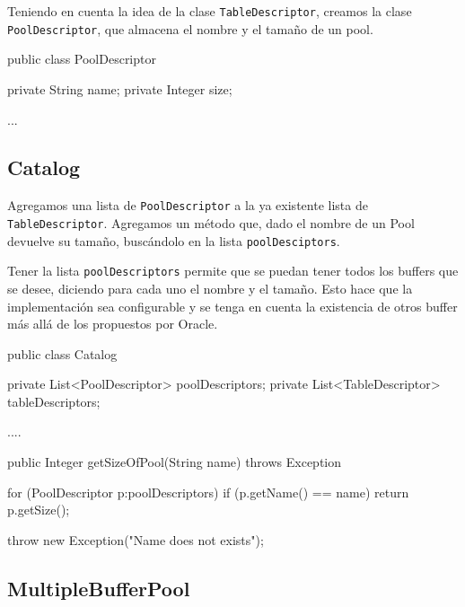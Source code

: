 \noindent
Teniendo en cuenta la idea de la clase \texttt{TableDescriptor},
creamos la clase \texttt{PoolDescriptor}, que almacena el 
nombre y el tamaño de un pool.

\vspace*{-0.2cm}
\begin{verbatimtab}[4]
public class PoolDescriptor
{
	private String name;
	private Integer size;

	...
}
\end{verbatimtab}


\newpage

\subsection{Catalog}

\noindent
Agregamos una lista de \texttt{PoolDescriptor} a la ya existente lista 
de \texttt{TableDescriptor}.
Agregamos un método que, dado el nombre de un Pool devuelve su tamaño, 
buscándolo en la lista \texttt{poolDesciptors}.

\vspace*{0.5cm}

\noindent
Tener la lista \texttt{poolDescriptors} permite que se puedan tener
todos los buffers que se desee, diciendo para cada uno el nombre y 
el tamaño. Esto hace que la implementación sea configurable y
se tenga en cuenta la existencia de otros buffer más allá de los
propuestos por Oracle.

\begin{verbatimtab}[4]
public class Catalog
{
	private List<PoolDescriptor> poolDescriptors;
	private List<TableDescriptor> tableDescriptors;	

	....

	public Integer getSizeOfPool(String name) throws Exception 
	{
		for (PoolDescriptor p:poolDescriptors)
		{
			if (p.getName() == name)
			{
				return p.getSize();
			}
		}
		
		throw new Exception("Name does not exists");
	}
}
\end{verbatimtab}


\subsection{MultipleBufferPool}


